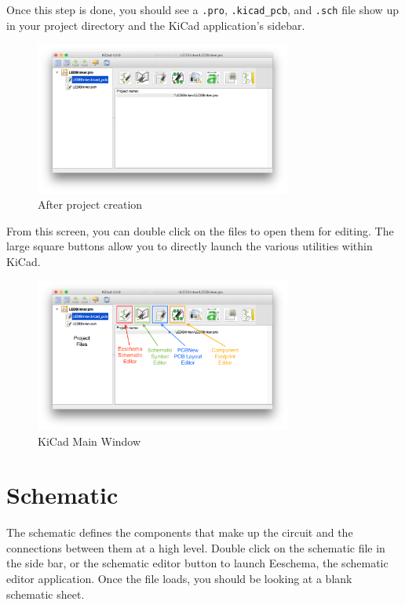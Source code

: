 \documentclass[12pt, oneside]{article}
\begin{document}
Once this step is done, you should see a \texttt{.pro}, \texttt{.kicad\_pcb}, and \texttt{.sch} file show up in your project directory and the KiCad application's sidebar.

\begin{figure}[H]
\includegraphics[width=0.75\textwidth]{CreateProject}
\centering
\caption{After project creation}
\end{figure}

From this screen, you can double click on the files to open them for editing. The large square buttons allow you to directly launch the various utilities within KiCad.

\begin{figure}[H]
\includegraphics[width=0.75\textwidth]{CreateProject_annotated}
\centering
\caption{KiCad Main Window}
\end{figure}

\section{Schematic}
The schematic defines the components that make up the circuit and the connections between them at a high level. Double click on the schematic file in the side bar, or the schematic editor button to launch Eeschema, the schematic editor application. Once the file loads, you should be looking at a blank schematic sheet.
\end{document}

